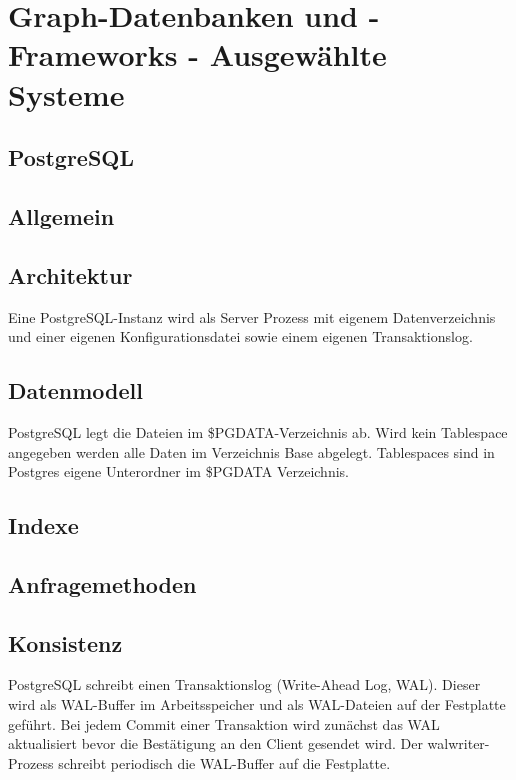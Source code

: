 \chapter{Graph-Datenbanken und -Frameworks - Ausgewählte Systeme }
\section{PostgreSQL}
\section{Allgemein}
\section{Architektur}
Eine PostgreSQL-Instanz wird als Server Prozess mit eigenem Datenverzeichnis und einer eigenen Konfigurationsdatei sowie einem eigenen Transaktionslog.
\section{Datenmodell}
PostgreSQL legt die Dateien im \$PGDATA-Verzeichnis ab. Wird kein Tablespace angegeben werden alle Daten im Verzeichnis Base abgelegt. Tablespaces sind in Postgres eigene Unterordner im \$PGDATA Verzeichnis.
\section{Indexe}
\section{Anfragemethoden}
\section{Konsistenz}
PostgreSQL schreibt einen Transaktionslog (Write-Ahead Log, WAL).
Dieser wird als WAL-Buffer im Arbeitsspeicher und als WAL-Dateien auf der Festplatte geführt.
Bei jedem Commit einer Transaktion wird zunächst das WAL aktualisiert bevor die Bestätigung an den Client gesendet wird.
Der walwriter-Prozess schreibt periodisch die WAL-Buffer auf die Festplatte.
